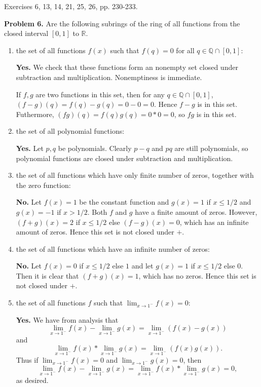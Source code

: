 \documentclass[12pt]{article}
\theoremstyle{remark}
\theoremstyle{named}
\begin{document}
Exercises 6, 13, 14, 21, 25, 26, pp. 230-233.

\textbf{Problem 6.} Are the following subrings of the ring of all functions from the closed interval \([0, 1]\) to \(\mathbb R\).
\begin{enumerate}
    \item the set of all functions \(f(x)\) such that \(f(q) = 0\) for all \(q \in \mathbb Q \cap [0, 1]\): 
    
    \textbf{Yes.} We check that these functions form an nonempty set closed under subtraction and multiplication. Nonemptiness is immediate. 

    If \(f, g\) are two functions in this set, then for any \(q \in \mathbb Q \cap [0, 1]\), \((f - g)(q) = f(q) - g(q) = 0 - 0 = 0\). Hence \(f - g\) is in this set. Futhermore, \((fg)(q) = f(q)g(q) = 0 * 0 = 0\), so \(fg\) is in this set. 

    \item the set of all polynomial functions: 
    
    \textbf{Yes.} Let \(p, q\) be polynomials. Clearly \(p - q\) and \(pq\) are still polynomials, so polynomial functions are closed under subtraction and multiplication.
    
    \item the set of all functions which have only finite number of zeros, together with the zero function: 
    
    \textbf{No.} Let \(f(x) = 1\) be the constant function and \(g(x) = 1\) if \(x \le 1/2\) and \(g(x) = -1\) if \(x > 1/2\). Both \(f\) and \(g\) have a finite amount of zeros. However, \((f + g)(x) = 2\) if \(x \le 1/2\) else \((f - g)(x) = 0\), which has an infinite amount of zeros. Hence this set is not closed under \(+\).
    
    \item the set of all functions which have an infinite number of zeros: 
    
    \textbf{No.} Let \(f(x) = 0\) if \(x \le 1/2\) else \(1\) and let \(g(x) = 1\) if \(x \le 1/2\) else \(0\). Then it is clear that \((f + g)(x) = 1\), which has no zeros. Hence this set is not closed under \(+\). 
    
    \item the set of all functions \(f\) such that \(\lim_{x \to 1^-} f(x) = 0\): 
    
    \textbf{Yes.} We have from analysis that 
    \[\lim_{x \to 1^-} f(x) - \lim_{x \to 1^-} g(x) = \lim_{x \to 1^-} (f(x) - g(x))\]
    and 
    \[\lim_{x \to 1^-} f(x) * \lim_{x \to 1^-} g(x) = \lim_{x \to 1^-} (f(x)g(x)).\]
    Thus if \(\lim_{x \to 1^-} f(x) = 0\) and \(\lim_{x \to 1^-} g(x) = 0\), then \[\lim_{x \to 1^-} f(x) - \lim_{x \to 1^-} g(x) = \lim_{x \to 1^-} f(x) * \lim_{x \to 1^-} g(x) = 0,\]
    as desired.
    

\end{enumerate}
\end{document}
